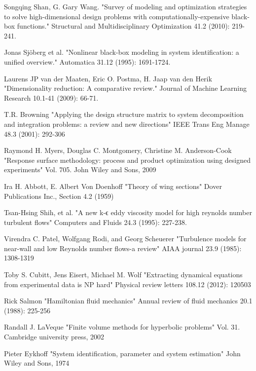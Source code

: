 \documentclass[a4paper,onecolumn]{article}
\theoremstyle{remark}
\begin{document}
\begin{thebibliography}{9}
Songqing Shan, G. Gary Wang. 
"Survey of modeling and optimization strategies to solve high-dimensional design problems with computationally-expensive black-box functions." 
Structural and Multidisciplinary Optimization 41.2 (2010): 219-241.

Jonas Sjöberg et al.
"Nonlinear black-box modeling in system identification: a unified overview." 
Automatica 31.12 (1995): 1691-1724.

Laurens JP van der Maaten, Eric O. Postma, H. Jaap van den Herik
"Dimensionality reduction: A comparative review." 
Journal of Machine Learning Research 10.1-41 (2009): 66-71.

T.R. Browning
"Applying the design structure matrix to system decomposition and integration problems: a review
 and new directions"
IEEE Trans Eng Manage 48.3 (2001): 292-306

Raymond H. Myers, Douglas C. Montgomery, Christine M. Anderson-Cook
"Response surface methodology: process and product optimization using designed experiments"
Vol. 705. John Wiley and Sons, 2009

Ira H. Abbott, E. Albert Von Doenhoff
"Theory of wing sections"
Dover Publications Inc., Section 4.2 (1959)

Tsan-Hsing Shih, et al. 
"A new k-ϵ eddy viscosity model for high reynolds number turbulent flows" 
Computers and Fluids 24.3 (1995): 227-238.

Virendra C. Patel, Wolfgang Rodi, and Georg Scheuerer
"Turbulence models for near-wall and low Reynolds number flows-a review"
AIAA journal 23.9 (1985): 1308-1319

Toby S. Cubitt, Jens Eisert, Michael M. Wolf
"Extracting dynamical equations from experimental data is NP hard"
Physical review letters 108.12 (2012): 120503

Rick Salmon 
"Hamiltonian fluid mechanics"
Annual review of fluid mechanics 20.1 (1988): 225-256

Randall J. LaVeque
"Finite volume methods for hyperbolic problems"
Vol. 31. Cambridge university press, 2002

Pieter Eykhoff
"System identification, parameter and system estimation"
John Wiley and Sons, 1974


\end{thebibliography}
\end{document}
